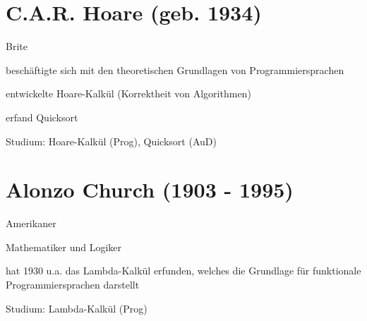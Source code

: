 \documentclass[a4paper,12pt]{report}
\begin{document}
\section*{C.A.R. Hoare (geb. 1934)}
\begin{itemize*}
	\item Brite
	\item beschäftigte sich mit den theoretischen Grundlagen von Programmiersprachen
	\item entwickelte Hoare-Kalkül (Korrektheit von Algorithmen)
	\item erfand Quicksort
	\item Studium: Hoare-Kalkül (Prog), Quicksort (AuD)
\end{itemize*}

\section*{Alonzo Church (1903 - 1995)}
\begin{itemize*}
	\item Amerikaner
	\item Mathematiker und Logiker
	\item hat 1930 u.a. das Lambda-Kalkül erfunden, welches die Grundlage für funktionale Programmiersprachen darstellt
	\item Studium: Lambda-Kalkül (Prog)
\end{itemize*}
\end{document}
